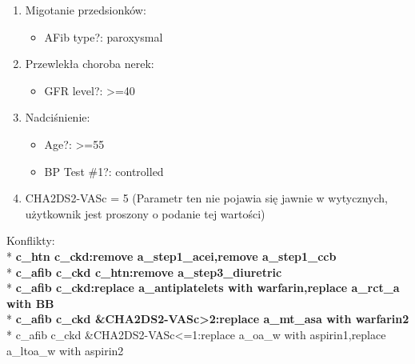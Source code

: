 \begin{enumerate}
\item{Migotanie przedsionków:
	\begin{itemize}
	\item{AFib type?: paroxysmal}
	\end{itemize}
}
\item{Przewlekła choroba nerek:
	\begin{itemize}
	\item{GFR level?: >=40}
	\end{itemize}
}
\item{Nadciśnienie:
	\begin{itemize}
	\item{Age?: >=55}
	\item{BP Test \#1?: controlled}
	\end{itemize}
}
\item{CHA2DS2-VASc = 5 (Parametr ten nie pojawia się jawnie w wytycznych, użytkownik jest proszony o podanie tej wartości)}
\end{enumerate}
Konflikty:\\*
\textbf{c\_htn c\_ckd:remove a\_step1\_acei,remove a\_step1\_ccb}\\*
\textbf{c\_afib c\_ckd c\_htn:remove a\_step3\_diuretric}\\*
\textbf{c\_afib c\_ckd:replace a\_antiplatelets with warfarin,replace a\_rct\_a with BB}\\*
\textbf{c\_afib c\_ckd \&CHA2DS2-VASc>2:replace a\_mt\_asa with warfarin2}\\*
c\_afib c\_ckd \&CHA2DS2-VASc<=1:replace a\_oa\_w with aspirin1,replace a\_ltoa\_w with aspirin2

